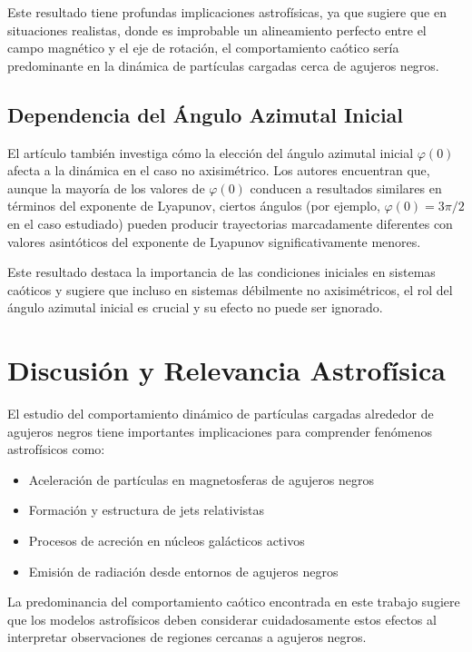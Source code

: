 \documentclass[a4paper,12pt]{article}
\begin{document}
Este resultado tiene profundas implicaciones astrofísicas, ya que sugiere que en situaciones realistas, donde es improbable un alineamiento perfecto entre el campo magnético y el eje de rotación, el comportamiento caótico sería predominante en la dinámica de partículas cargadas cerca de agujeros negros.

\subsection{Dependencia del Ángulo Azimutal Inicial}

El artículo también investiga cómo la elección del ángulo azimutal inicial $\varphi(0)$ afecta a la dinámica en el caso no axisimétrico. Los autores encuentran que, aunque la mayoría de los valores de $\varphi(0)$ conducen a resultados similares en términos del exponente de Lyapunov, ciertos ángulos (por ejemplo, $\varphi(0)=3\pi/2$ en el caso estudiado) pueden producir trayectorias marcadamente diferentes con valores asintóticos del exponente de Lyapunov significativamente menores.

Este resultado destaca la importancia de las condiciones iniciales en sistemas caóticos y sugiere que incluso en sistemas débilmente no axisimétricos, el rol del ángulo azimutal inicial es crucial y su efecto no puede ser ignorado.

\section{Discusión y Relevancia Astrofísica}

El estudio del comportamiento dinámico de partículas cargadas alrededor de agujeros negros tiene importantes implicaciones para comprender fenómenos astrofísicos como:

\begin{itemize}
    \item Aceleración de partículas en magnetosferas de agujeros negros
    \item Formación y estructura de jets relativistas
    \item Procesos de acreción en núcleos galácticos activos
    \item Emisión de radiación desde entornos de agujeros negros
\end{itemize}

La predominancia del comportamiento caótico encontrada en este trabajo sugiere que los modelos astrofísicos deben considerar cuidadosamente estos efectos al interpretar observaciones de regiones cercanas a agujeros negros.
\end{document}
